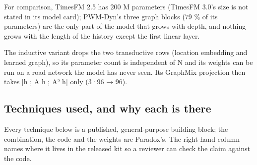 \documentclass[
  10pt,
]{article}
\begin{document}
For comparison, TimesFM 2.5 has 200 M parameters (TimesFM 3.0's size is
not stated in its model card); PWM-Dyn's three graph blocks (79 \% of its parameters) are
the only part of the model that grows with depth, and nothing grows with
the length of the history except the first linear layer.

The inductive variant drops the two transductive rows (location
embedding and learned graph), so its parameter count is independent of N
and its weights can be run on a road network the model has never seen.
Its GraphMix projection then takes {[}h ; A h ; A² h{]} only (3·96 →
96).

\subsection{Techniques used, and why each is there}

Every technique below is a published, general-purpose building block;
the combination, the code and the weights are Paradox's. The right-hand
column names where it lives in the released kit so a reviewer can check
the claim against the code.
\end{document}
